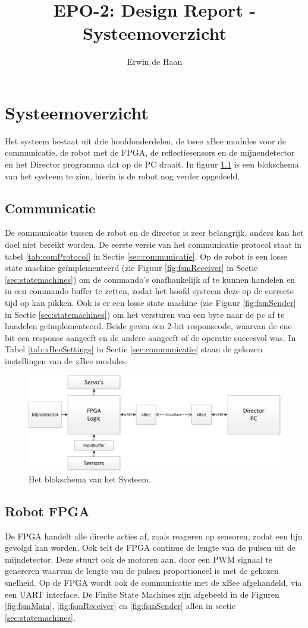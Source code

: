 \documentclass{report}
\title{EPO-2: Design Report - Systeemoverzicht}
\author{Erwin de Haan}
\begin{document}
\chapter{Systeemoverzicht}
\label{ch:systeem}
Het systeem bestaat uit drie hoofdonderdelen, de twee xBee modules voor de communicatie, de robot met de FPGA, de reflectiesensors en de mijnendetector en het Director programma dat op de PC draait.
In figuur \ref{fig:topLevelSystem} is een blokschema van het systeem te zien, hierin is de robot nog verder opgedeeld. 
\section{Communicatie}
De communicatie tussen de robot en de director is zeer belangrijk, anders kan het doel niet bereikt worden.
De eerste versie van het communicatie protocol staat in tabel \ref{tab:comProtocol} in Sectie \ref{sec:communicatie}.
Op de robot is een losse state machine geïmplementeerd (zie Figuur \ref{fig:fsmReceiver} in Sectie \ref{sec:statemachines}) om de commando's onafhankelijk af te kunnen handelen en in een commando buffer te zetten, zodat het hoofd systeem deze op de correcte tijd op kan pikken.
Ook is er een losse state machine (zie Figuur \ref{fig:fsmSender} in Sectie \ref{sec:statemachines}) om het versturen van een byte naar de pc af te handelen geïmplementeerd.
Beide geven een 2-bit responscode, waarvan de ene bit een response aangeeft en de andere aangeeft of de operatie succesvol was.
In Tabel \ref{tab:xBeeSettings} in Sectie \ref{sec:communicatie} staan de gekozen instellingen van de xBee modules.
\begin{figure}
\centering
\caption{Het blokschema van het Systeem.}
\label{fig:topLevelSystem}
\includegraphics[width=\textwidth]{top-level-system}
\end{figure}
\section{Robot FPGA}
De FPGA handelt alle directe acties af, zoals reageren op sensoren, zodat een lijn gevolgd kan worden. Ook telt de FPGA continue de lengte van de pulsen uit de mijndetector.
Deze stuurt ook de motoren aan, door een PWM signaal te genereren waarvan de lengte van de pulsen proportioneel is met de gekozen snelheid.
Op de FPGA wordt ook de communicatie met de xBee afgehandeld, via een UART interface.
De Finite State Machines zijn afgebeeld in de Figuren \ref{fig:fsmMain}, \ref{fig:fsmReceiver} en \ref{fig:fsmSender} allen in sectie \ref{sec:statemachines}.
\end{document}
